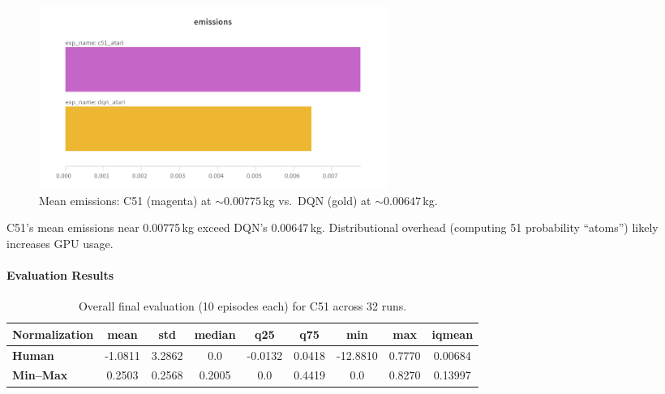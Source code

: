 \begin{figure}
	\centering
	\includegraphics[width=0.55\textwidth]{figures/c51/emissions_dqn_c51.png}
	\caption{Mean emissions: C51 (magenta) at $\sim0.00775$\,kg vs.\ DQN (gold) at $\sim0.00647$\,kg.}
	\label{fig:c51_vs_dqn_emissions}
\end{figure}

C51’s mean emissions near 0.00775\,kg exceed DQN’s 0.00647\,kg. 
Distributional overhead (computing 51 probability “atoms”) likely increases GPU usage.

\paragraph{Evaluation Results}

\begin{table}
	\caption{Overall final evaluation (10 episodes each) for C51 across 32 runs.}
	\label{tab:c51_eval_overall}
	\centering
	\begin{tabular}{lcccccccc}
		\toprule
		\textbf{Normalization} & \textbf{mean} & \textbf{std} & \textbf{median} & 
		\textbf{q25} & \textbf{q75} & \textbf{min} & \textbf{max} & \textbf{iqmean} \\
		\midrule
		\textbf{Human}   & -1.0811 & 3.2862 & 0.0 & -0.0132 & 0.0418 & -12.8810 & 0.7770 & 0.00684 \\
		\textbf{Min--Max}& 0.2503 & 0.2568 & 0.2005 & 0.0 & 0.4419 & 0.0 & 0.8270 & 0.13997 \\
		\bottomrule
	\end{tabular}
\end{table}

